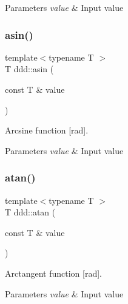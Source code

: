 \begin{DoxyParams}{Parameters}
{\em value} & Input value \\
\hline
\end{DoxyParams}
\mbox{\label{namespaceddd_af887d6f09da2128f99b36b034ab2ed1f}} 
\subsubsection{\texorpdfstring{asin()}{asin()}}
{\footnotesize\ttfamily template$<$typename T $>$ \\
T ddd\+::asin (\begin{DoxyParamCaption}\item[{const T \&}]{value }\end{DoxyParamCaption})\hspace{0.3cm}{\ttfamily [inline]}}



Arcsine function \mbox{[}rad\mbox{]}. 


\begin{DoxyParams}{Parameters}
{\em value} & Input value \\
\hline
\end{DoxyParams}
\mbox{\label{namespaceddd_a750f7cad6893bbbfbaa51353044bde4f}} 
\subsubsection{\texorpdfstring{atan()}{atan()}}
{\footnotesize\ttfamily template$<$typename T $>$ \\
T ddd\+::atan (\begin{DoxyParamCaption}\item[{const T \&}]{value }\end{DoxyParamCaption})\hspace{0.3cm}{\ttfamily [inline]}}



Arctangent function \mbox{[}rad\mbox{]}. 


\begin{DoxyParams}{Parameters}
{\em value} & Input value \\
\hline
\end{DoxyParams}
\mbox{\label{namespaceddd_a1dea631509d981c3718796774b796d6c}} 
